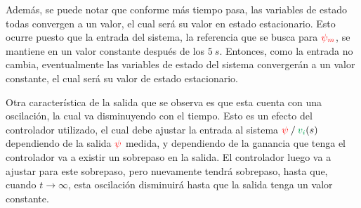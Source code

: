 Además, se puede notar que conforme más tiempo pasa, las variables de estado todas
convergen a un valor, el cual será su valor en estado estacionario. Esto ocurre
puesto que la entrada del sistema, la referencia que se busca para $\mathbin{\color{red}\psi_{m}}$,
se mantiene en un valor constante después de los $5\ \unit{s}$. Entonces, como la
entrada no cambia, eventualmente las variables de estado del sistema convergerán
a un valor constante, el cual será su valor de estado estacionario.

Otra característica de la salida que se observa es que esta cuenta con una
oscilación, la cual va disminuyendo con el tiempo. Esto es un efecto del controlador
utilizado, el cual debe ajustar la entrada al sistema $\rojo{\psi}\mathbin{/}\verd{v_{i}}(s)$
dependiendo de la salida $\mathbin{\color{red}\psi}$ medida, y dependiendo de la ganancia que
tenga el controlador va a existir un sobrepaso en la salida. El controlador luego
va a ajustar para este sobrepaso, pero nuevamente tendrá sobrepaso, hasta que,
cuando $t \to \infty$, esta oscilación disminuirá hasta que la salida tenga un
valor constante.
